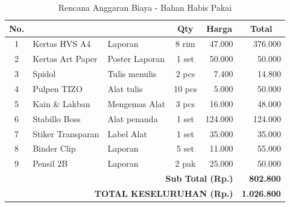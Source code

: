 \newpage
\begin{table}[htbp]
\centering
\caption{Rencana Anggaran Biaya - Bahan Habis Pakai}
\label{tab:rab_bahan}
\begin{tabular}{|c|>{\raggedright\arraybackslash}p{3cm}|>{\raggedright\arraybackslash}p{2.8cm}|c|r|r|} %
\hline
\textbf{No.} & \multicolumn{1}{c|}{\textbf{Material}} & \multicolumn{1}{c|}{\textbf{Justifikasi}} & \textbf{Qty} & \multicolumn{1}{c|}{\textbf{Harga}} & \multicolumn{1}{c|}{\textbf{Total}} \\ \hline
1 & Kertas HVS A4 & Laporan & 8 rim & 47.000 & 376.000 \\ \hline
2 & Kertas Art Paper & Poster Laporan & 1 set & 50.000 & 50.000 \\ \hline
3 & Spidol & Tulis menulis & 2 pcs & 7.400 & 14.800 \\ \hline
4 & Pulpen TIZO & Alat tulis & 10 pcs & 5.000 & 50.000 \\ \hline
5 & Kain \& Lakban & Mengemas Alat & 3 pcs & 16.000 & 48.000 \\ \hline
6 & Stabillo Boss & Alat penanda & 1 set & 124.000 & 124.000 \\ \hline
7 & Stiker Transparan & Label Alat & 1 set & 35.000 & 35.000 \\ \hline
8 & Binder Clip & Laporan & 5 set & 11.000 & 55.000 \\ \hline
9 & Pensil 2B & Laporan & 2 pak & 25.000 & 50.000 \\ \hline
\multicolumn{5}{|r|}{\textbf{Sub Total (Rp.)}} & \textbf{802.800} \\ \hline
\multicolumn{5}{|r|}{\textbf{TOTAL KESELURUHAN (Rp.)}} & \textbf{1.026.800} \\ \hline
\end{tabular}
\end{table}